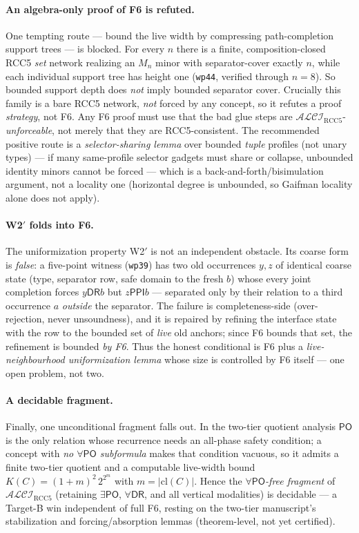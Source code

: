 \documentclass[11pt]{article}
\newcommand{\ALCIRCC}{\mathcal{ALCI}_{\mathrm{RCC5}}}
\newcommand{\code}[1]{\texttt{#1}}
\newcommand{\DR}{\mathsf{DR}}
\newcommand{\PO}{\mathsf{PO}}
\newcommand{\PPI}{\mathsf{PPI}}
\theoremstyle{plain}
\theoremstyle{definition}
\begin{document}
\paragraph{An algebra-only proof of F6 is refuted.}
One tempting route --- bound the live width by compressing
path-completion support trees --- is blocked. For every $n$ there is a
finite, composition-closed RCC5 \emph{set} network realizing an $M_n$
minor with separator-cover exactly $n$, while each individual support
tree has height one (\code{wp44}, verified through $n=8$). So bounded
support depth does \emph{not} imply bounded separator cover. Crucially
this family is a bare RCC5 network, \emph{not} forced by any concept, so
it refutes a proof \emph{strategy}, not F6. Any F6 proof must use that
the bad glue steps are $\ALCIRCC$-\emph{unforceable}, not merely that
they are RCC5-consistent. The recommended positive route is a
\emph{selector-sharing lemma} over bounded \emph{tuple} profiles (not
unary types) --- if many same-profile selector gadgets must share or
collapse, unbounded identity minors cannot be forced --- which is a
back-and-forth/bisimulation argument, not a locality one (horizontal
degree is unbounded, so Gaifman locality alone does not apply).

\paragraph{W2$'$ folds into F6.}
The uniformization property W2$'$ is not an independent obstacle. Its
coarse form is \emph{false}: a five-point witness (\code{wp39}) has two
old occurrences $y,z$ of identical coarse state (type, separator row,
safe domain to the fresh $b$) whose every joint completion forces
$y\mathbin{\DR}b$ but $z\mathbin{\PPI}b$ --- separated only by their
relation to a third occurrence $a$ \emph{outside} the separator. The
failure is completeness-side (over-rejection, never unsoundness), and it
is repaired by refining the interface state with the row to the bounded
set of \emph{live} old anchors; since F6 bounds that set, the refinement
is bounded \emph{by F6}. Thus the honest conditional is F6 plus a
\emph{live-neighbourhood uniformization lemma} whose size is controlled
by F6 itself --- one open problem, not two.

\paragraph{A decidable fragment.}
Finally, one unconditional fragment falls out. In the two-tier quotient
analysis $\PO$ is the only relation whose recurrence needs an all-phase
safety condition; a concept with \emph{no $\forall\PO$ subformula} makes
that condition vacuous, so it admits a finite two-tier quotient and a
computable live-width bound $K(C)=(1+m)^2\,2^{2^m}$ with
$m=|\mathrm{cl}(C)|$.
Hence the \emph{$\forall\PO$-free fragment} of $\ALCIRCC$ (retaining
$\exists\PO$, $\forall\DR$, and all vertical modalities) is decidable
--- a Target-B win independent of full F6, resting on the two-tier
manuscript's stabilization and forcing/absorption lemmas
(theorem-level, not yet certified).
\end{document}

